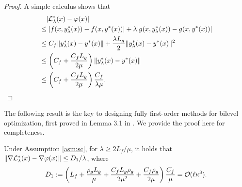 \begin{proof}
A simple calculus shows that
    \begin{align*}
    &\quad \vert {\mathcal{L}}_{\lambda}^*(x) - \varphi(x) \vert \\
    &\le   \vert f(x,y_{\lambda}^*(x)) - f(x,y^*(x)) \vert + \lambda \vert g(x,y_{\lambda}^*(x)) - g(x,y^*(x)) \vert \\
    &\le C_f  \Vert y_{\lambda}^*(x) - y^*(x) \Vert + \frac{\lambda L_g}{2} \Vert y_{\lambda}^*(x) - y^*(x) \Vert^2 \\
    &\le \left(C_f + \frac{C_f L_g}{2 \mu} \right) \Vert y_{\lambda}^*(x) - y^*(x) \Vert \\
    &\le \left(C_f + \frac{C_f L_g}{2 \mu} \right) \frac{C_f }{\lambda \mu}.
    \end{align*}
\end{proof}
The following result is the key to designing fully first-order methods for bilevel optimization, first proved in Lemma 3.1 in \cite{kwon2023fully}. We provide the proof here for completeness.
\begin{lem} \label{lem:key-fully}
Under Assumption \ref{asm:sc}, for $\lambda \ge 2L_f/ \mu$,  it holds that $\Vert \nabla {\mathcal{L}}_{\lambda}^*(x) - \nabla \varphi(x) \Vert \le D_1 / \lambda$, where
\begin{align} \label{eq:D-lambda}
    D_1 :=  \left( L_f 
   + \frac{\rho_g L_g}{\mu} + \frac{C_f L_g \rho_g}{2\mu^2} + \frac{C_f \rho_g}{2\mu} 
    \right) \frac{C_f}{\mu} = {\mathcal{O}}(\ell \kappa^3).
\end{align}
\end{lem}

